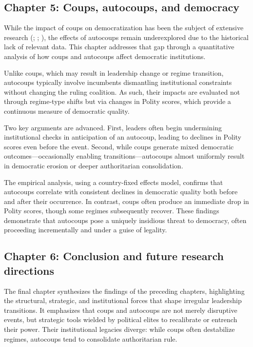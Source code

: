 \documentclass[
  12pt,
]{report}
\begin{document}
\subsection*{Chapter 5: Coups, autocoups, and
democracy}\label{chapter-5-coups-autocoups-and-democracy}

While the impact of coups on democratization has been the subject of
extensive research (; ;
), the effects of
autocoups remain underexplored due to the historical lack of relevant
data. This chapter addresses that gap through a quantitative analysis of
how coups and autocoups affect democratic institutions.

Unlike coups, which may result in leadership change or regime
transition, autocoups typically involve incumbents dismantling
institutional constraints without changing the ruling coalition. As
such, their impacts are evaluated not through regime-type shifts but via
changes in Polity scores, which provide a continuous measure of
democratic quality.

Two key arguments are advanced. First, leaders often begin undermining
institutional checks in anticipation of an autocoup, leading to declines
in Polity scores even before the event. Second, while coups generate
mixed democratic outcomes---occasionally enabling
transitions---autocoups almost uniformly result in democratic erosion or
deeper authoritarian consolidation.

The empirical analysis, using a country-fixed effects model, confirms
that autocoups correlate with consistent declines in democratic quality
both before and after their occurrence. In contrast, coups often produce
an immediate drop in Polity scores, though some regimes subsequently
recover. These findings demonstrate that autocoups pose a uniquely
insidious threat to democracy, often proceeding incrementally and under
a guise of legality.

\subsection*{Chapter 6: Conclusion and future research
directions}\label{chapter-6-conclusion-and-future-research-directions}

The final chapter synthesizes the findings of the preceding chapters,
highlighting the structural, strategic, and institutional forces that
shape irregular leadership transitions. It emphasizes that coups and
autocoups are not merely disruptive events, but strategic tools wielded
by political elites to recalibrate or entrench their power. Their
institutional legacies diverge: while coups often destabilize regimes,
autocoups tend to consolidate authoritarian rule.
\end{document}
